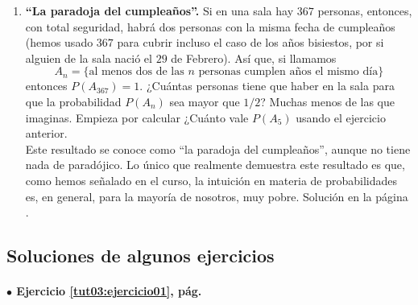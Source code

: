 \documentclass[10pt,a4paper]{article}\usepackage[]{graphicx}\usepackage[]{color}
\begin{document}
\begin{enumerate}
\item \label{tut03:ejercicio39} {\bf ``La paradoja del cumpleaños''.} Si en una sala hay $367$ personas, entonces, con total seguridad, habrá dos personas con la misma fecha de cumpleaños (hemos usado $367$ para cubrir incluso el caso de los años bisiestos, por si alguien de la sala nació el $29$ de Febrero). Así que, si llamamos
$$A_n= \{\mbox{al menos dos de las $n$ personas cumplen años el mismo día}\}$$
entonces $P(A_{367})=1$. ¿Cuántas personas tiene que haber en la sala para que la probabilidad $P(A_{n})$ sea mayor que $1/2$? Muchas menos de las que imaginas. Empieza por calcular ¿Cuánto vale $P(A_{5})$ usando el ejercicio anterior.\\
Este resultado se conoce como ``la paradoja del cumpleaños'', aunque no tiene nada de paradójico. Lo único que realmente demuestra este resultado es que, como hemos señalado en el curso, la intuición en materia de probabilidades es, en general, para la mayoría de nosotros, muy pobre.%
Solución en la página \pageref{tut03:ejercicio39:sol}. 

\end{enumerate}

\subsection*{Soluciones de algunos ejercicios}

\paragraph{\bf $\bullet$ Ejercicio \ref{tut03:ejercicio01}, pág. \pageref{tut03:ejercicio01}}
\label{tut03:ejercicio01:sol}\quad\\
\end{document}
